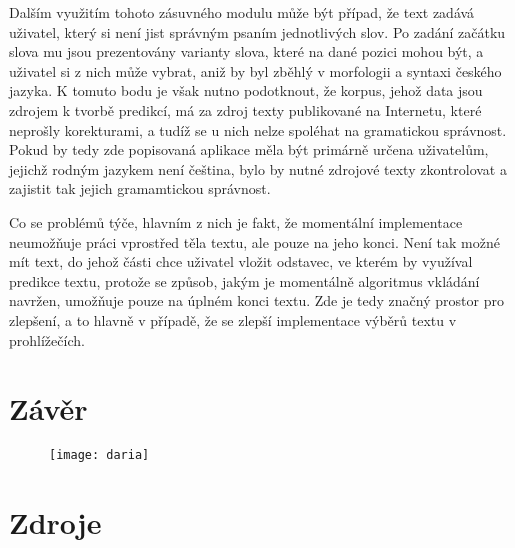 \documentclass[a4paper,11pt]{article}
\begin{document}
Dalším využitím tohoto zásuvného modulu může být případ, že text zadává uživatel, který si není jist správným psaním jednotlivých slov. Po zadání začátku slova mu jsou prezentovány varianty slova, které na dané pozici mohou být, a uživatel si z nich může vybrat, aniž by byl zběhlý v morfologii a syntaxi českého jazyka. K tomuto bodu je však nutno podotknout, že korpus, jehož data jsou zdrojem k tvorbě predikcí, má za zdroj texty publikované na Internetu, které neprošly korekturami, a tudíž se u nich nelze spoléhat na gramatickou správnost. Pokud by tedy zde popisovaná aplikace měla být primárně určena uživatelům, jejichž rodným jazykem není čeština, bylo by nutné zdrojové texty zkontrolovat a zajistit tak jejich gramamtickou správnost.

Co se problémů týče, hlavním z nich je fakt, že momentální implementace neumožňuje práci vprostřed těla textu, ale pouze na jeho konci. Není tak možné mít text, do jehož části chce uživatel vložit odstavec, ve kterém by využíval predikce textu, protože se způsob, jakým je momentálně algoritmus vkládání navržen, umožňuje pouze na úplném konci textu. Zde je tedy značný prostor pro zlepšení, a to hlavně v případě, že se zlepší implementace výběrů textu v prohlížečích.


\section*{Závěr}

\begin{figure}[h]
	\centering
	\texttt{[image: daria]}
\end{figure}
\section*{Zdroje}



\end{document}
